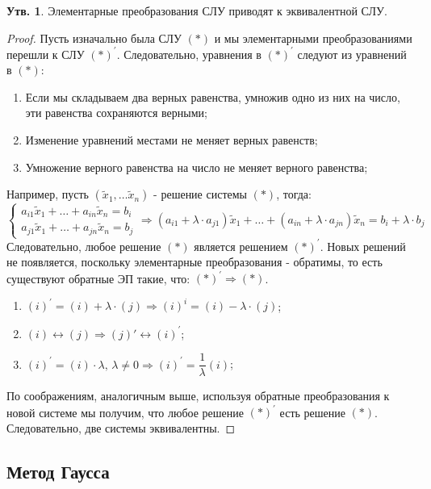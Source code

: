 \documentclass[12pt]{article}
\theoremstyle{definition}
\newtheorem{prop}{Утв.}
\newcommand{\wte}[1]{\widetilde{#1}}
\begin{document}
\newpage

\begin{prop}
	Элементарные преобразования СЛУ приводят к эквивалентной СЛУ.
\end{prop}
\begin{proof}
	Пусть изначально была СЛУ $(*)$ и мы элементарными преобразованиями перешли к СЛУ $(*)^{'}$. Следовательно, уравнения в $(*)^{'}$ следуют из уравнений в $(*)$: 
	\begin{enumerate}[label=\arabic*)]
		\item Если мы складываем два верных равенства, умножив одно из них на число, эти равенства сохраняются верными;
		\item Изменение уравнений местами не меняет верных равенств;
		\item Умножение верного равенства на число не меняет верного равенства;
	\end{enumerate}
	Например, пусть $(\wte{x}_1, \dotsc \wte{x}_n)$ - решение системы $(*)$, тогда:
	$$
		\begin{cases}
			a_{i1}\wte{x}_1 + \dotsc + a_{in}\wte{x}_n = b_i \\
			a_{j1}\wte{x}_1 + \dotsc + a_{jn}\wte{x}_n = b_j
		\end{cases} \Rightarrow
		(a_{i1} + \lambda{\cdot}a_{j1})\wte{x}_1 + \dotsc + (a_{in} + \lambda{\cdot}a_{jn})\wte{x}_n = b_i + \lambda{\cdot} b_j
	$$
	Следовательно, любое решение $(*)$ является решением $(*)^{'}$. Новых решений не появляется, поскольку элементарные преобразования - обратимы, то есть существуют обратные ЭП такие, что: $(*)^{'} \Rightarrow (*)$.
	\begin{enumerate}[label=\arabic*)]
		\item $(i)^{'} = (i) + \lambda{\cdot}(j) \Rightarrow (i)^{i} = (i) - \lambda{\cdot}(j)$;
		\item $(i) \leftrightarrow (j) \Rightarrow (j){'} \leftrightarrow (i)^{'}$;
		\item $(i)^{'} = (i){\cdot}\lambda, \, \lambda \neq 0 \Rightarrow (i)^{'} = \dfrac{1}{\lambda}(i)$;
	\end{enumerate}
	По соображениям, аналогичным выше, используя обратные преобразования к новой системе мы получим, что любое решение $(*)^{'}$ есть решение $(*)$. Следовательно, две системы эквивалентны.
\end{proof}
\subsection*{Метод Гаусса}
\end{document}
